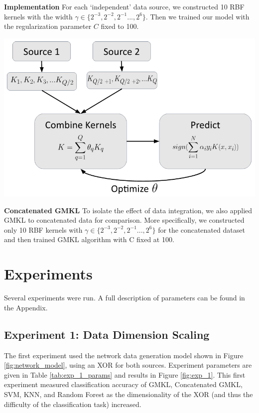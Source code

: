 \documentclass{article}
\begin{document}
\textbf{Implementation}
For each `independent' data source, we constructed 10 RBF kernels with the
width $\gamma \in \{2^{-3}, 2^{-2}, 2^{-1} ..., 2^{6}\}$. Then we trained our
model with the regularization parameter $C$ fixed to 100.

\begin{minipage}{\textwidth}
    \centering
    \includegraphics[scale=.4]{implementation_flowchart.png}
    \label{fig:implementation_flowchart}
\end{minipage}

\textbf{Concatenated GMKL}
To isolate the effect of data integration, we also applied GMKL to concatenated
data for comparison. More specifically, we constructed only 10 RBF kernels with
$\gamma \in \{2^{-3}, 2^{-2}, 2^{-1} ..., 2^{6}\}$ for the concatenated dataset
and then trained GMKL algorithm with C fixed at 100.













\section*{Experiments}

Several experiments were run. A full description of parameters can be found in
the Appendix.


\subsection*{Experiment 1: Data Dimension Scaling}
The first experiment used the network data generation model shown in Figure
\ref{fig:network_model}, using an XOR for both sources. Experiment parameters
are given in Table \ref{tab:exp_1_params} and results in Figure
\ref{fig:exp_1}. This first experiment measured classification accuracy of
GMKL, Concatenated GMKL, SVM, KNN, and Random Forest as the dimensionality of
the XOR (and thus the difficulty of the classification task) increased.
\end{document}
